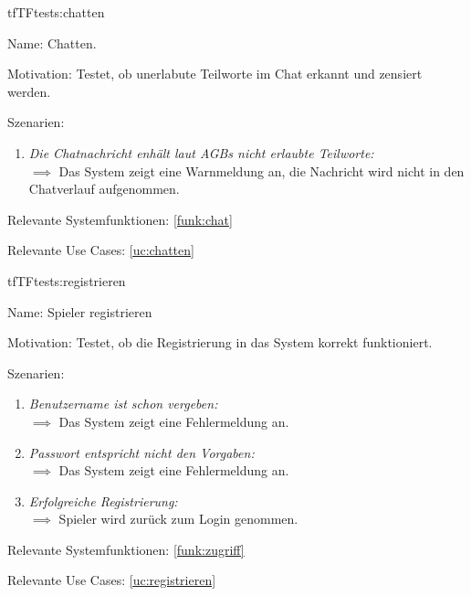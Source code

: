 \begin{description}[leftmargin=5em, style=sameline]
\begin{lhp}{tf}{TF}{tests:chatten}
	\item [Name:] Chatten.
	\item [Motivation:] Testet, ob unerlabute Teilworte im Chat erkannt und zensiert werden.
	\item [Szenarien:] \hfill
		\begin{enumerate}
			\item \textit{Die Chatnachricht enhält laut AGBs nicht erlaubte Teilworte:} \\ $\implies$ Das System zeigt eine Warnmeldung an, die Nachricht wird nicht in den Chatverlauf aufgenommen.
		\end{enumerate}
	\item [Relevante Systemfunktionen:] \ref{funk:chat}
	\item [Relevante Use Cases:] \ref{uc:chatten}
\end{lhp}

\begin{lhp}{tf}{TF}{tests:registrieren}
	\item [Name:] Spieler registrieren
	\item [Motivation:] Testet, ob die Registrierung in das System korrekt funktioniert.
	\item [Szenarien:] \hfill
		\begin{enumerate}
		        \item \textit{Benutzername ist schon vergeben:} \\ $\implies$  
		        Das System zeigt eine Fehlermeldung an.
				
				\item \textit{Passwort entspricht nicht den Vorgaben:} \\ $\implies$ Das System zeigt eine Fehlermeldung an.
				
				\item \textit{Erfolgreiche Registrierung:} \\ $\implies$ Spieler wird zurück zum Login genommen.
		\end{enumerate}
	\item [Relevante Systemfunktionen:] \ref{funk:zugriff}
	\item [Relevante Use Cases:] \ref{uc:registrieren}
\end{lhp}


\end{description}
